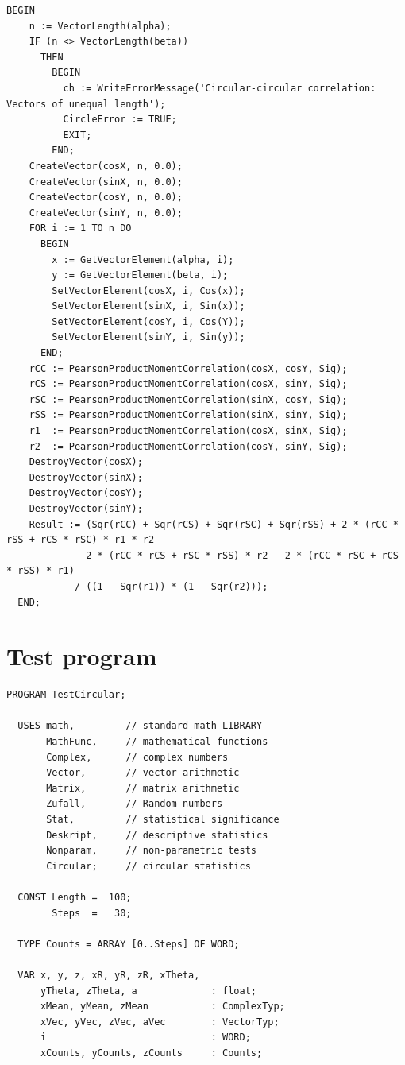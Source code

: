 \begin{refsection}
\begin{lstlisting}[caption=Jupp-Mardia]
  BEGIN
    n := VectorLength(alpha);
    IF (n <> VectorLength(beta))
      THEN
        BEGIN
          ch := WriteErrorMessage('Circular-circular correlation: Vectors of unequal length');
          CircleError := TRUE;
          EXIT;
        END;
    CreateVector(cosX, n, 0.0);
    CreateVector(sinX, n, 0.0);
    CreateVector(cosY, n, 0.0);
    CreateVector(sinY, n, 0.0);
    FOR i := 1 TO n DO
      BEGIN
        x := GetVectorElement(alpha, i);
        y := GetVectorElement(beta, i);
        SetVectorElement(cosX, i, Cos(x));
        SetVectorElement(sinX, i, Sin(x));
        SetVectorElement(cosY, i, Cos(Y));
        SetVectorElement(sinY, i, Sin(y));
      END;
    rCC := PearsonProductMomentCorrelation(cosX, cosY, Sig);
    rCS := PearsonProductMomentCorrelation(cosX, sinY, Sig);
    rSC := PearsonProductMomentCorrelation(sinX, cosY, Sig);
    rSS := PearsonProductMomentCorrelation(sinX, sinY, Sig);
    r1  := PearsonProductMomentCorrelation(cosX, sinX, Sig);
    r2  := PearsonProductMomentCorrelation(cosY, sinY, Sig);
    DestroyVector(cosX);
    DestroyVector(sinX);
    DestroyVector(cosY);
    DestroyVector(sinY);
    Result := (Sqr(rCC) + Sqr(rCS) + Sqr(rSC) + Sqr(rSS) + 2 * (rCC * rSS + rCS * rSC) * r1 * r2
            - 2 * (rCC * rCS + rSC * rSS) * r2 - 2 * (rCC * rSC + rCS * rSS) * r1)
            / ((1 - Sqr(r1)) * (1 - Sqr(r2)));
  END;
\end{lstlisting}


\section{Test program}

\begin{lstlisting}[caption=Test program]
  PROGRAM TestCircular;

  USES math,         // standard math LIBRARY
       MathFunc,     // mathematical functions
       Complex,      // complex numbers
       Vector,       // vector arithmetic
       Matrix,       // matrix arithmetic
       Zufall,       // Random numbers
       Stat,         // statistical significance
       Deskript,     // descriptive statistics
       Nonparam,     // non-parametric tests
       Circular;     // circular statistics

  CONST Length =  100;
        Steps  =   30;

  TYPE Counts = ARRAY [0..Steps] OF WORD;

  VAR x, y, z, xR, yR, zR, xTheta,
      yTheta, zTheta, a             : float;
      xMean, yMean, zMean           : ComplexTyp;
      xVec, yVec, zVec, aVec        : VectorTyp;
      i                             : WORD;
      xCounts, yCounts, zCounts     : Counts;


\end{lstlisting}
\end{refsection}
